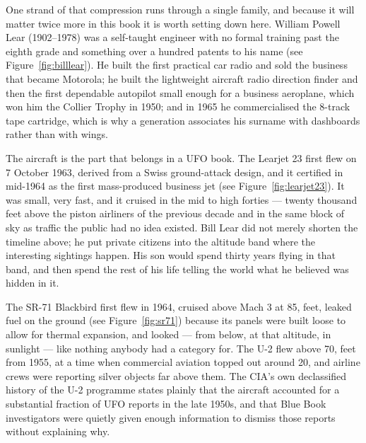 One strand of that compression runs through a single family, and because it will matter twice more
in this book it is worth setting down here. William Powell Lear (1902--1978) was a self-taught
engineer with no formal training past the eighth grade and something over a hundred patents to his
name (see Figure~\ref{fig:billlear}). He built the first practical car radio and sold the business that became Motorola;
he built the lightweight aircraft radio direction finder and then the first dependable autopilot
small enough for a business aeroplane, which won him the Collier Trophy in 1950; and in 1965 he
commercialised the 8-track tape cartridge, which is why a generation associates his surname with
dashboards rather than with wings.

The aircraft is the part that belongs in a UFO book. The Learjet 23 first flew on 7 October 1963,
derived from a Swiss ground-attack design, and it certified in mid-1964 as the first mass-produced
business jet (see Figure~\ref{fig:learjet23}). It was small, very fast, and it cruised in the mid to high forties --- twenty
thousand feet above the piston airliners of the previous decade and in the same block of sky as
traffic the public had no idea existed. Bill Lear did not merely shorten the timeline above; he put
private citizens into the altitude band where the interesting sightings happen. His son would spend
thirty years flying in that band, and then spend the rest of his life telling the world what he
believed was hidden in it.

The SR-71 Blackbird first flew in 1964, cruised above Mach 3 at 85, feet, leaked fuel on the ground (see Figure~\ref{fig:sr71}) because its panels were built loose to allow for thermal expansion, and looked --- from
below, at that altitude, in sunlight --- like nothing anybody had a category for. The U-2 flew
above 70, feet from 1955, at a time when commercial aviation topped out around 20, and
airline crews were reporting silver objects far above them. The CIA's own declassified history of
the U-2 programme states plainly that the aircraft accounted for a substantial fraction of UFO
reports in the late 1950s, and that Blue Book investigators were quietly given enough
information to dismiss those reports without explaining why.

